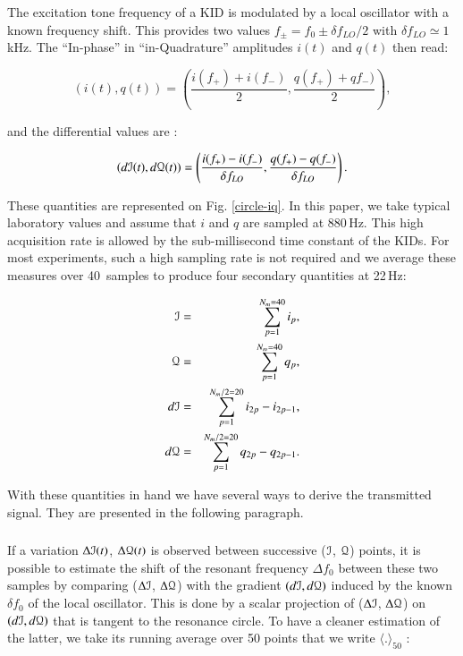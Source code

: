 The excitation tone frequency of a KID is modulated by a local oscillator with a
known frequency shift. This provides two values $f_{\pm} = f_0 \pm \delta
  f_{LO}/2$ with $\delta f_{LO} \simeq 1$\,kHz. The ``In-phase'' in
``in-Quadrature'' amplitudes $i(t)$ and $q(t)$ then read:

\begin{equation}
(i(t), q(t)) = (\frac{i(f_{+}) +
    i(f_{-})}{2},
\frac{q(f_{+}) + qf_{-})}{2}),
\end{equation}

and the differential values are :

\begin{equation}
\label{gradient}
(d\mathcal{I}(t), d\mathcal{Q}(t)) =
\left(\frac{i(f_{+}) - i(f_{-})}{\delta f_{LO}},
\frac{q(f_{+}) - q(f_{-})}{\delta f_{LO}}\right).
\end{equation}

These quantities are represented on Fig. \ref{circle-iq}. In this paper, we take
typical laboratory values and assume that $i$ and $q$ are sampled at
880\,Hz. This high acquisition rate is allowed by the sub-millisecond time
constant of the KIDs. For most experiments, such a high sampling rate is not
required and we average these measures over 40~samples to produce
four secondary quantities at 22\,Hz:

\begin{eqnarray}
\mathcal{I}  &=& \sum^{N_{m}=40}_{p=1} i_{p},\\
\mathcal{Q}  &=& \sum^{N_{m}=40}_{p=1} q_{p},\\
d\mathcal{I} &=& \sum^{N_{m}/2=20}_{p=1} i_{2p} - i_{2p-1},\\
d\mathcal{Q} &=& \sum^{N_{m}/2=20}_{p=1} q_{2p} - q_{2p-1}.
\end{eqnarray}

With these quantities in hand we have several ways to derive the transmitted
signal. They are presented in the following paragraph.

\subsubsection{\rf}
If a variation $\Delta\mathcal{I}(t)$, $\Delta\mathcal{Q}(t)$ is observed between successive ($\mathcal{I}$,
$\mathcal{Q}$) points, it is possible to estimate the shift of the resonant frequency
$\Delta f_{0}$ between these two samples by comparing ($\Delta \mathcal{I}$, $\Delta \mathcal{Q}$)
with the gradient $(d\mathcal{I},d\mathcal{Q})$ induced by the known $\delta
f_{0}$ of the local oscillator. This is done by a scalar projection of ($\Delta\mathcal{I}$,
$\Delta\mathcal{Q}$) on $(d\mathcal{I},d\mathcal{Q})$ that is tangent to the resonance circle. To have a
cleaner estimation of the latter, we take its running average over 50
points that we write $\langle . \rangle_{50}$ \citep{2014A&A...569A...9C}:

